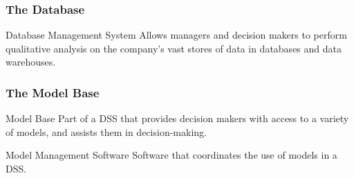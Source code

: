 \documentclass[\main/notes.tex]{subfiles}
\begin{document}
				\subsubsection{The Database}
					\begin{definition}{Database Management System}
						Allows managers and decision makers to perform qualitative analysis on the company's vast stores of data in databases and data warehouses.
					\end{definition}
				\subsubsection{The Model Base}
					\begin{definition}{Model Base}
						Part of a DSS that provides decision makers with access to a variety of models, and assists them in decision-making.
					\end{definition}
					\begin{definition}{Model Management Software}
						Software that coordinates the use of models in a DSS.
					\end{definition}

	\vbox{}
\end{document}
